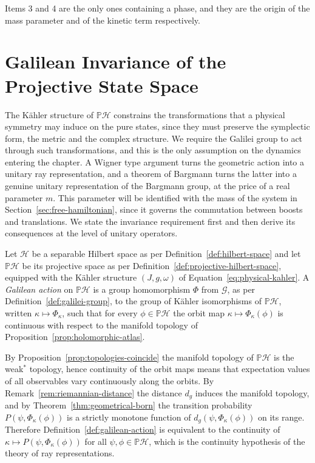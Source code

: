 \noindent Items 3 and 4 are the only ones containing a phase, and they are the origin of the mass parameter and of the kinetic term respectively.

\section{Galilean Invariance of the Projective State Space}
\label{sec:invariance}

The Kähler structure of $\mathbb{P}\mathcal{H}$ constrains the transformations that a physical symmetry may induce on the pure states, since they must preserve the symplectic form, the metric and the complex structure. We require the Galilei group to act through such transformations, and this is the only assumption on the dynamics entering the chapter. A Wigner type argument turns the geometric action into a unitary ray representation, and a theorem of Bargmann turns the latter into a genuine unitary representation of the Bargmann group, at the price of a real parameter $m$. This parameter will be identified with the mass of the system in Section~\ref{sec:free-hamiltonian}, since it governs the commutation between boosts and translations. We state the invariance requirement first and then derive its consequences at the level of unitary operators.

\begin{definition}\label{def:galilean-action}
	Let $\mathcal{H}$ be a separable Hilbert space as per Definition~\ref{def:hilbert-space} and let $\mathbb{P}\mathcal{H}$ be its projective space as per Definition~\ref{def:projective-hilbert-space}, equipped with the Kähler structure $(J,g,\omega)$ of Equation~\eqref{eq:physical-kahler}. A \emph{Galilean action} on $\mathbb{P}\mathcal{H}$ is a group homomorphism $\Phi$ from $\mathcal{G}$, as per Definition~\ref{def:galilei-group}, to the group of Kähler isomorphisms of $\mathbb{P}\mathcal{H}$, written $\kappa\mapsto\Phi_\kappa$, such that for every $\phi\in\mathbb{P}\mathcal{H}$ the orbit map $\kappa\mapsto\Phi_\kappa(\phi)$ is continuous with respect to the manifold topology of Proposition~\ref{prop:holomorphic-atlas}.
\end{definition}

\begin{remark}
	By Proposition~\ref{prop:topologies-coincide} the manifold topology of $\mathbb{P}\mathcal{H}$ is the weak$^*$ topology, hence continuity of the orbit maps means that expectation values of all observables vary continuously along the orbits. By Remark~\ref{rem:riemannian-distance} the distance $d_g$ induces the manifold topology, and by Theorem~\ref{thm:geometrical-born} the transition probability $P(\psi,\Phi_\kappa(\phi))$ is a strictly monotone function of $d_g(\psi,\Phi_\kappa(\phi))$ on its range. Therefore Definition~\ref{def:galilean-action} is equivalent to the continuity of $\kappa\mapsto P(\psi,\Phi_\kappa(\phi))$ for all $\psi,\phi\in\mathbb{P}\mathcal{H}$, which is the continuity hypothesis of the theory of ray representations.
\end{remark}

